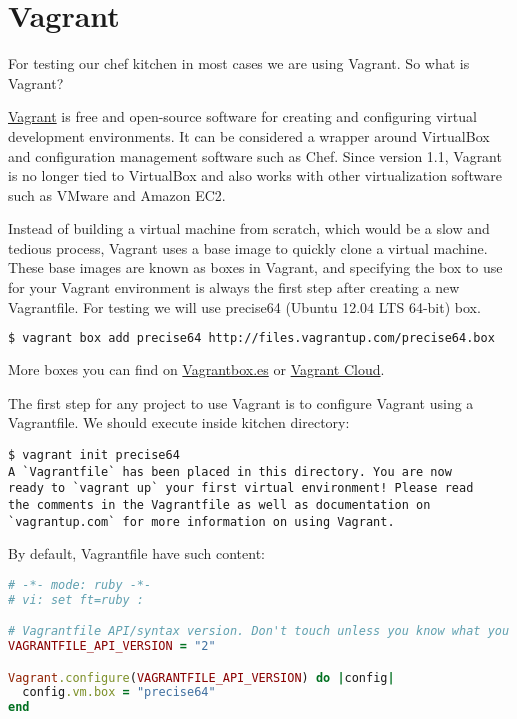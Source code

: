 \section{Vagrant}
\label{sec:solo-vagrant}

For testing our chef kitchen in most cases we are using Vagrant. So what is Vagrant?

\href{http://www.vagrantup.com/}{Vagrant} is free and open-source software for creating and configuring virtual development environments. It can be considered a wrapper around VirtualBox and configuration management software such as Chef. Since version 1.1, Vagrant is no longer tied to VirtualBox and also works with other virtualization software such as VMware and Amazon EC2.

Instead of building a virtual machine from scratch, which would be a slow and tedious process, Vagrant uses a base image to quickly clone a virtual machine. These base images are known as boxes in Vagrant, and specifying the box to use for your Vagrant environment is always the first step after creating a new Vagrantfile. For testing we will use precise64 (Ubuntu 12.04 LTS 64-bit) box.

\begin{lstlisting}[language=Bash,label=lst:my-cloud-vagrant1]
$ vagrant box add precise64 http://files.vagrantup.com/precise64.box
\end{lstlisting}

More boxes you can find on \href{http://www.vagrantbox.es/}{Vagrantbox.es} or \href{https://vagrantcloud.com/}{Vagrant Cloud}.

The first step for any project to use Vagrant is to configure Vagrant using a Vagrantfile. We should execute  inside kitchen directory:

\begin{lstlisting}[label=lst:my-cloud-vagrant2]
$ vagrant init precise64
A `Vagrantfile` has been placed in this directory. You are now
ready to `vagrant up` your first virtual environment! Please read
the comments in the Vagrantfile as well as documentation on
`vagrantup.com` for more information on using Vagrant.
\end{lstlisting}

By default, Vagrantfile have such content:

\begin{lstlisting}[language=Ruby,label=lst:my-cloud-vagrant3,title=my-cloud/nodes/Vagrantfile]
# -*- mode: ruby -*-
# vi: set ft=ruby :

# Vagrantfile API/syntax version. Don't touch unless you know what you're doing!
VAGRANTFILE_API_VERSION = "2"

Vagrant.configure(VAGRANTFILE_API_VERSION) do |config|
  config.vm.box = "precise64"
end
\end{lstlisting}

